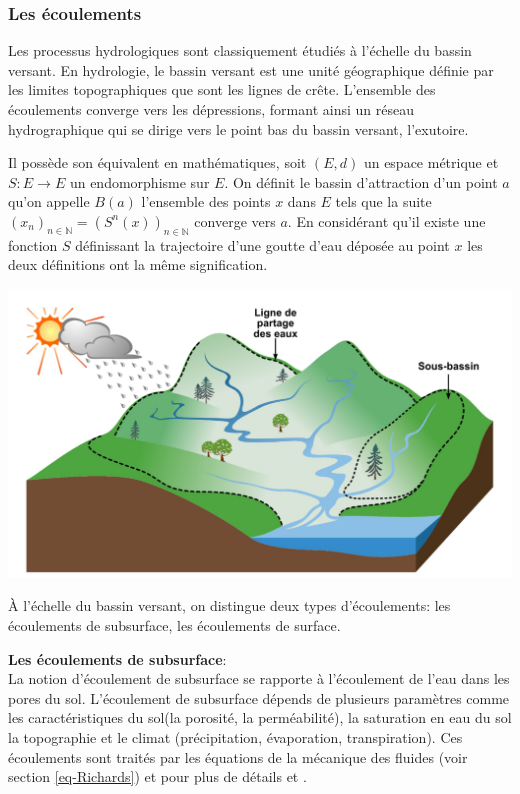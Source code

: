 \documentclass[a4paper,11pt]{article}
\begin{document}
\subsubsection{Les écoulements}

Les processus hydrologiques sont classiquement étudiés à l’échelle du bassin versant. En hydrologie, le bassin versant est une unité géographique définie par les limites topographiques que sont les lignes de crête. L’ensemble des écoulements converge vers les dépressions, formant ainsi un réseau hydrographique qui se dirige vers le point bas du bassin versant, l’exutoire.

Il possède son équivalent en mathématiques, soit $(E,d)$ un espace métrique et $S:E\to E$ un endomorphisme sur $E$. On définit le bassin d'attraction d'un point $a$ qu'on appelle $B(a)$ l'ensemble des points $x$ dans $E$ tels que la suite $(x_n)_{n \in \mathbb{N}}=(S^n(x))_{n \in \mathbb{N}}$ converge vers $a$. En considérant qu'il existe une fonction $S$ définissant la trajectoire d'une goutte d'eau déposée au point $x$ les deux définitions ont la même signification.

\begin{center}
	\captionsetup{type=figure}
	\includegraphics[scale=0.15]{bassin_versant.png}
\end{center} 

À l’échelle du bassin versant, on distingue deux types d’écoulements: les écoulements de subsurface, les écoulements de surface. 

\textbf{Les écoulements de subsurface}:\\

La notion d'écoulement de subsurface se rapporte à l'écoulement de l'eau dans les pores du sol. L'écoulement de subsurface dépends de plusieurs paramètres comme les caractéristiques du sol(la porosité, la perméabilité), la saturation en eau du sol la topographie et le climat (précipitation, évaporation, transpiration). Ces écoulements sont traités par les équations de la mécanique des fluides (voir section  \ref{eq-Richards}) et pour plus de détails \cite{maquin2016developpement} et \cite{marsily_de1986quantitative}. 
\end{document}
